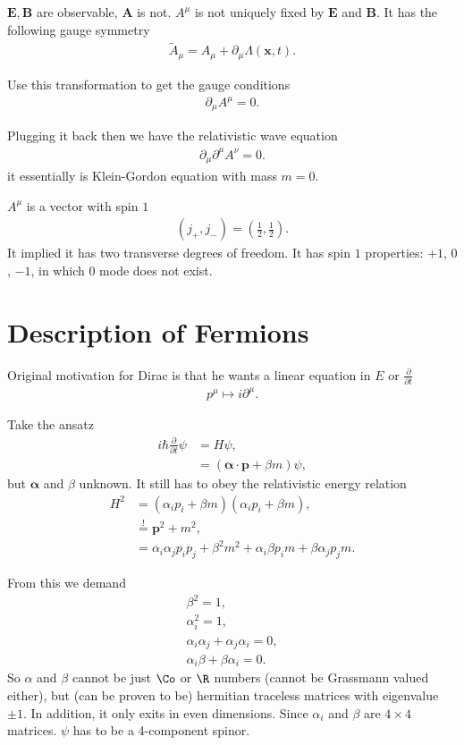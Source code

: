 $\pmb{E}, \pmb{B}$ are observable, $\pmb{A}$ is not. $A^\mu$ is not uniquely fixed by $\pmb{E}$ and $\pmb{B}$. It has the following gauge symmetry
\begin{align}
   \tilde{A}_{\mu} = A_\mu + \partial_\mu \Lambda(\pmb{x}, t).
\end{align}

Use this transformation to get the gauge conditions
\begin{align}
   \partial_\mu A^\mu = 0.
\end{align}

Plugging it back then we have the relativistic wave equation
\begin{align}
   \partial_\mu \partial^\mu A^\nu = 0.
\end{align}
it essentially is Klein-Gordon equation with mass $m=0$.

$A^\mu$ is a vector with spin $1$
\begin{align*}
   (j_+, j_-) = \left( \frac{1}{2}, \frac{1}{2} \right).
\end{align*}
It implied it has two transverse degrees of freedom. It has spin $1$ properties: $+1$, $0$, $-1$, in which $0$ mode does not exist.

\section{Description of Fermions}
Original motivation for Dirac is that he wants a linear equation in $E$ or $\frac{\partial}{\partial t}$
\begin{align*}
   p^\mu \mapsto i\partial^\mu.
\end{align*}

Take the ansatz
\begin{align*}
   i\hbar \frac{\partial}{\partial t}\psi &= H \psi, \\
   &= (\pmb{\alpha}\cdot \pmb{p} + \beta m ) \psi,
\end{align*}
but $\pmb{\alpha}$ and $\beta$ unknown. It still has to obey the relativistic energy relation
\begin{align*}
   H^2 &= \left( \alpha_ip_i + \beta m \right) \left( \alpha_ip_i + \beta m \right), \\
     &\stackrel{!}{=} \pmb{p}^2 + m^2, \\
     &= \alpha_i \alpha_j p_i p_j + \beta^2m^2 + \alpha_i \beta p_i m + \beta \alpha_j p_j m.
\end{align*}

From this we demand
\begin{align}
   \beta^2 = 1, \\
   \alpha_i^2 = 1, \\
   \alpha_i \alpha_j + \alpha_j \alpha_i = 0, \\
   \alpha_i \beta + \beta \alpha_i = 0.
\end{align}
So $\alpha$ and $\beta$ cannot be just $\Co$ or $\R$ numbers (cannot be Grassmann valued either), but (can be proven to be) hermitian traceless matrices with eigenvalue $\pm 1$.  In addition, it only exits in even dimensions.
Since $\alpha_i$ and $\beta$ are $4\times4$ matrices. $\psi$ has to be a 4-component spinor.

